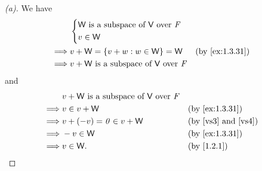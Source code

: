 \begin{proof}[(a)]
  We have
  \begin{align*}
             & \begin{dcases}
                 \W \text{ is a subspace of } \V \text{ over } \F \\
                 v \in \W
               \end{dcases}                         \\
    \implies & v + \W = \set{v + w : w \in \W} = \W                 &  & \by{ex:1.3.31} \\
    \implies & v + \W \text{ is a subspace of } \V \text{ over } \F
  \end{align*}
  and
  \begin{align*}
             & v + \W \text{ is a subspace of } \V \text{ over } \F                                          \\
    \implies & v \in v + \W                                         &  & \by{ex:1.3.31}                      \\
    \implies & v + (-v) = \zv \in v + \W                            &  & \text{(by \ref{vs3} and \ref{vs4})} \\
    \implies & -v \in \W                                            &  & \by{ex:1.3.31}                      \\
    \implies & v \in \W.                                            &  & \by{1.2.1}
  \end{align*}
\end{proof}

